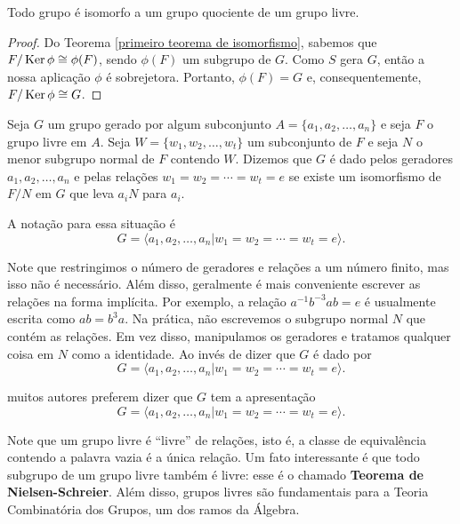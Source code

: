	\begin{corollary}
	\label{iso grupo quociente}
		Todo grupo é isomorfo a um grupo quociente de um grupo livre.
	\end{corollary}
	\begin{proof}
		Do Teorema \eqref{primeiro teorema de isomorfismo}, sabemos que $F/\operatorname{Ker}\phi\cong \phi(F)$, 
		sendo $\phi(F)$ um subgrupo de $G$. Como $S$ gera $G$, então a nossa aplicação $\phi$ é sobrejetora.
		Portanto, $\phi(F) = G$ e, consequentemente, $F/\operatorname{Ker}\phi\cong G$.
	\end{proof}
	\begin{deff}
		Seja $G$ um grupo gerado por algum subconjunto $A = \{ a_1, a_2, \dots, a_n \}$ e seja 
		$F$ o grupo livre em $A$. Seja $W = \{ w_1, w_2, \dots, w_t \}$ um subconjunto de $F$ e seja 
		$N$ o menor subgrupo normal de $F$ contendo $W$. Dizemos que $G$ é dado pelos geradores 
		$a_1, a_2, \dots, a_n$ e pelas relações $w_1 = w_2 = \cdots = w_t = e$ se existe um isomorfismo 
		de $F/N$ em $G$ que leva $a_iN$ para $a_i$.
	\end{deff}
	\par\vspace{0.3cm} A notação para essa situação é
	\begin{equation*}
	    G = \langle a_1, a_2, \dots, a_n | w_1 = w_2 = \cdots = w_t = e \rangle.
	\end{equation*}
	\par\vspace{0.3cm} Note que restringimos o número de geradores e relações a um número finito, 
	mas isso não é necessário. Além disso, geralmente é mais conveniente escrever as relações na 
	forma implícita. Por exemplo, a relação $a^{-1}b^{-3}ab = e$ é usualmente escrita como $ab = b^3a$.
	Na prática, não escrevemos o subgrupo normal $N$ que contém as relações. Em vez disso, manipulamos os
	geradores e tratamos qualquer coisa em $N$ como a identidade. Ao invés de dizer que $G$ é dado por  
	\begin{equation*}
	    G = \langle a_1, a_2, \dots, a_n | w_1 = w_2 = \cdots = w_t = e \rangle.
	\end{equation*}
	\par\vspace{0.3cm} muitos autores preferem dizer que $G$ tem a apresentação 
	\begin{equation*}
	    G = \langle a_1, a_2, \dots, a_n | w_1 = w_2 = \cdots = w_t = e \rangle.
	\end{equation*}
	\par\vspace{0.3cm} Note que um grupo livre é ``livre'' de relações, isto é, a classe de equivalência 
	contendo a palavra vazia é a única relação. Um fato interessante é que todo subgrupo de um grupo livre 
	também é livre: esse é o chamado \textbf{Teorema de Nielsen-Schreier}. Além disso, grupos livres são
	fundamentais para a Teoria Combinatória dos Grupos, um dos ramos da Álgebra.
	

